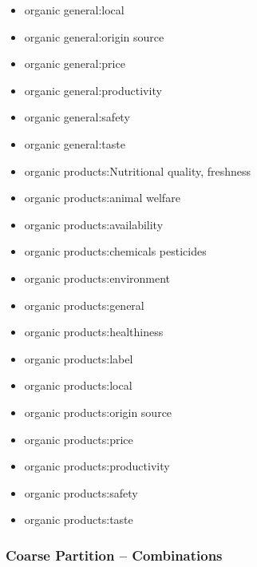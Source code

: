 \begin{multicols}{2}
\begin{itemize}[leftmargin=*]
        \item[] organic general:local 
        \item[] organic general:origin source 
        \item[] organic general:price 
        \item[] organic general:productivity
        \item[] organic general:safety 
        \item[] organic general:taste 
        \item[] organic products:Nutritional quality, freshness 
        \item[] organic products:animal welfare
        \item[] organic products:availability 
        \item[] organic products:chemicals pesticides 
        \item[] organic products:environment
        \item[] organic products:general
        \item[] organic products:healthiness
        \item[] organic products:label 
        \item[] organic products:local 
        \item[] organic products:origin source 
        \item[] organic products:price 
        \item[] organic products:productivity 
        \item[] organic products:safety
        \item[] organic products:taste 
        \label{li:08_og_aspects} 
    \end{itemize}
\end{multicols}

\subsubsection*{Coarse Partition -- Combinations}

